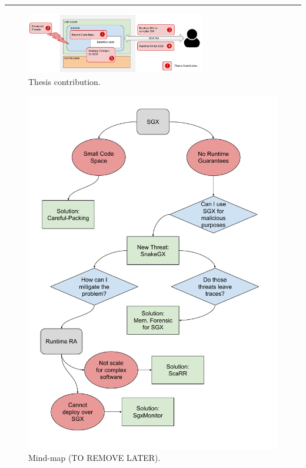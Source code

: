 \textcolor{red}{\hrule}
\vspace{0.5cm}

\begin{figure}[t]
	\centering
	\includegraphics[width=0.7\textwidth]{fig_c1/contribution.pdf}
	\caption[Thesis contribution.]{Thesis contribution.}
	\label{fig:contribution}
\end{figure}

\begin{figure}[t]
	\centering
	\includegraphics[width=\textwidth]{fig_c1/mind-map.pdf}
	\caption[Mind-map.]{Mind-map (TO REMOVE LATER).}
	\label{fig:mind-map}
\end{figure}


